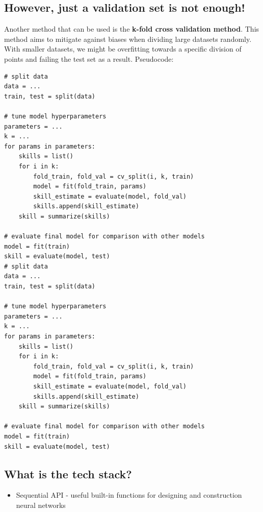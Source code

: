 \documentclass{article}
\begin{document}
\subsection{However, just a validation set is not enough!}
Another method that can be used is the \textbf{k-fold cross validation method}. This method aims to mitigate against biases when dividing large datasets randomly. With smaller datasets, we might be overfitting towards a specific division of points and failing the test set as a result. Pseudocode: 
\begin{verbatim}
# split data
data = ...
train, test = split(data)

# tune model hyperparameters
parameters = ...
k = ...
for params in parameters:
	skills = list()
	for i in k:
		fold_train, fold_val = cv_split(i, k, train)
		model = fit(fold_train, params)
		skill_estimate = evaluate(model, fold_val)
		skills.append(skill_estimate)
	skill = summarize(skills)

# evaluate final model for comparison with other models
model = fit(train)
skill = evaluate(model, test)
# split data
data = ...
train, test = split(data)
 
# tune model hyperparameters
parameters = ...
k = ...
for params in parameters:
	skills = list()
	for i in k:
		fold_train, fold_val = cv_split(i, k, train)
		model = fit(fold_train, params)
		skill_estimate = evaluate(model, fold_val)
		skills.append(skill_estimate)
	skill = summarize(skills)
 
# evaluate final model for comparison with other models
model = fit(train)
skill = evaluate(model, test)
\end{verbatim}
\subsection{What is the tech stack?}
\begin{itemize}
    \item Sequential API - useful built-in functions for designing and construction neural networks
\end{itemize}
\end{document}
